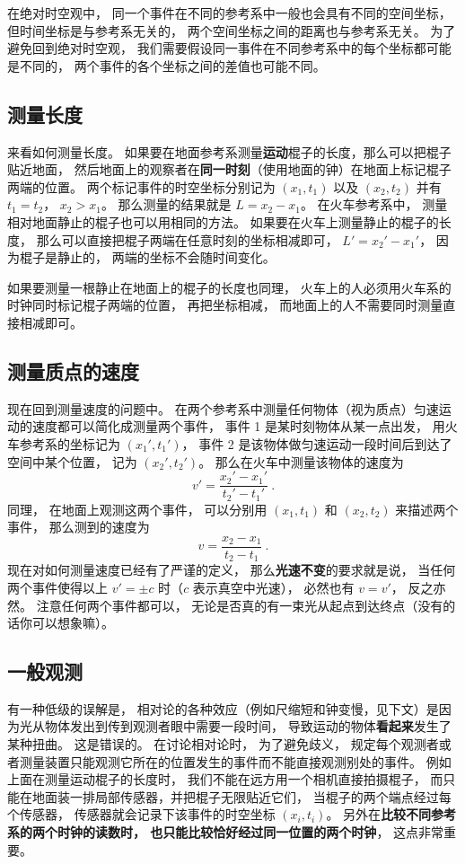 在绝对时空观中， 同一个事件在不同的参考系中一般也会具有不同的空间坐标， 但时间坐标是与参考系无关的， 两个空间坐标之间的距离也与参考系无关。 为了避免回到绝对时空观， 我们需要假设同一事件在不同参考系中的每个坐标都可能是不同的， 两个事件的各个坐标之间的差值也可能不同。

\subsection{测量长度}\label{sub_Relat0_3}
来看如何测量长度。 如果要在地面参考系测量\textbf{运动}棍子的长度，那么可以把棍子贴近地面， 然后地面上的观察者在\textbf{同一时刻}（使用地面的钟）在地面上标记棍子两端的位置。 两个标记事件的时空坐标分别记为 $(x_1, t_1)$ 以及 $(x_2, t_2)$ 并有 $t_1 = t_2$， $x_2 > x_1$。 那么测量的结果就是 $L = x_2 - x_1$。 在火车参考系中， 测量相对地面静止的棍子也可以用相同的方法。 如果要在火车上测量静止的棍子的长度， 那么可以直接把棍子两端在任意时刻的坐标相减即可， $L' = x_2' - x_1'$， 因为棍子是静止的， 两端的坐标不会随时间变化。

如果要测量一根静止在地面上的棍子的长度也同理， 火车上的人必须用火车系的时钟同时标记棍子两端的位置， 再把坐标相减， 而地面上的人不需要同时测量直接相减即可。

\subsection{测量质点的速度}
现在回到测量速度的问题中。 在两个参考系中测量任何物体（视为质点）匀速运动的速度都可以简化成测量两个事件， 事件 1 是某时刻物体从某一点出发， 用火车参考系的坐标记为 $(x_1', t_1')$， 事件 2 是该物体做匀速运动一段时间后到达了空间中某个位置， 记为 $(x_2', t_2')$。 那么在火车中测量该物体的速度为
\begin{equation} \label{eq_Relat0_2}
v' = \frac{x_2' - x_1'}{t_2' - t_1'}~.
\end{equation}
同理， 在地面上观测这两个事件， 可以分别用 $(x_1, t_1)$ 和 $(x_2, t_2)$ 来描述两个事件， 那么测到的速度为
\begin{equation} \label{eq_Relat0_1}
v = \frac{x_2 - x_1}{t_2 - t_1}~.
\end{equation}
现在对如何测量速度已经有了严谨的定义， 那么\textbf{光速不变}的要求就是说， 当任何两个事件使得以上 $v' = \pm c$ 时（$c$ 表示真空中光速）， 必然也有 $v = v'$， 反之亦然。 注意任何两个事件都可以， 无论是否真的有一束光从起点到达终点（没有的话你可以想象嘛）。

\subsection{一般观测}\label{sub_Relat0_2}
有一种低级的误解是， 相对论的各种效应（例如尺缩短和钟变慢，见下文）是因为光从物体发出到传到观测者眼中需要一段时间， 导致运动的物体\textbf{看起来}发生了某种扭曲。 这是错误的。 在讨论相对论时， 为了避免歧义， 规定每个观测者或者测量装置只能观测它所在的位置发生的事件而不能直接观测别处的事件。 例如上面在测量运动棍子的长度时， 我们不能在远方用一个相机直接拍摄棍子， 而只能在地面装一排局部传感器，并把棍子无限贴近它们， 当棍子的两个端点经过每个传感器， 传感器就会记录下该事件的时空坐标 $(x_i, t_i)$。 另外在\textbf{比较不同参考系的两个时钟的读数时， 也只能比较恰好经过同一位置的两个时钟}， 这点非常重要。

